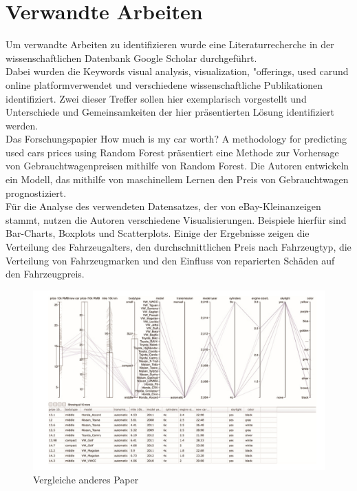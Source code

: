 \section{Verwandte Arbeiten}

Um verwandte Arbeiten zu identifizieren wurde eine Literaturrecherche in der wissenschaftlichen Datenbank Google Scholar durchgeführt. \\
Dabei wurden die Keywords \glqq visual analysis\grqq, \glqq visualization\grqq , "\glqq offerings\grqq , \glqq used car\grqq  und \glqq online platform\grqq  verwendet und verschiedene wissenschaftliche Publikationen identifiziert. Zwei dieser Treffer sollen hier exemplarisch vorgestellt und Unterschiede und Gemeinsamkeiten der hier präsentierten Lösung identifiziert werden. \\

Das Forschungspapier \glqq  How much is my car worth? A methodology for predicting used cars prices using Random Forest \grqq \cite{pal2017much} präsentiert eine Methode zur Vorhersage von Gebrauchtwagenpreisen mithilfe von Random Forest. Die Autoren entwickeln ein Modell, das mithilfe von maschinellem Lernen den Preis von Gebrauchtwagen prognostiziert.\\
Für die Analyse des verwendeten Datensatzes, der von eBay-Kleinanzeigen stammt, nutzen die Autoren verschiedene Visualisierungen. Beispiele hierfür sind Bar-Charts, Boxplots und Scatterplots.  Einige der  Ergebnisse zeigen die Verteilung des Fahrzeugalters, den durchschnittlichen Preis nach Fahrzeugtyp, die Verteilung von Fahrzeugmarken und den Einfluss von reparierten Schäden auf den Fahrzeugpreis. \\

\begin{figure}[H]
    \centering
    \includegraphics[width = \textwidth]{img/related_work.png}
    \caption{Vergleiche anderes Paper}
    \label{fig:related_work_vis}
\end{figure}

